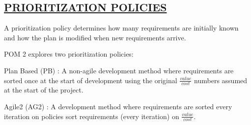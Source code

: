 \begin{kasten}
    \section*{ \hspace{0.1cm} {\color{red} \underline{PRIORITIZATION POLICIES}}}
    \large{
A prioritization policy determines how many requirements are initially known and
how the plan is modified when new requirements arrive.

\vspace{3 mm}
POM 2 explores two prioritization policies:
\begin{smallenum}
\item Plan Based (PB) : A non-agile development method
  where requirements are sorted once at the start of development
  using the original \(\frac{value}{cost}\) numbers assumed at the start 
  of the project.
\item Agile2 (AG2) : A development method where requirements are sorted every iteration on  policies sort requirements (every iteration) on \(\frac{value}{cost}\). 
\end{smallenum}
\vspace{-0.2em}
}
\end{kasten}
